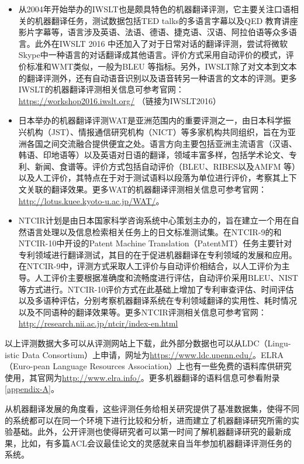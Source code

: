 \begin{itemize}
\vspace{0.5em}
\item 从2004年开始举办的IWSLT也是颇具特色的机器翻译评测，它主要关注口语相关的机器翻译任务，测试数据包括TED talks的多语言字幕以及QED 教育讲座影片字幕等，语言涉及英语、法语、德语、捷克语、汉语、阿拉伯语等众多语言。此外在IWSLT 2016 中还加入了对于日常对话的翻译评测，尝试将微软Skype中一种语言的对话翻译成其他语言。评价方式采用自动评价的模式，评价标准和WMT类似，一般为BLEU 等指标。另外，IWSLT除了对文本到文本的翻译评测外，还有自动语音识别以及语音转另一种语言的文本的评测。更多IWSLT的机器翻译评测相关信息可参考官网：\url{https://workshop2016.iwslt.org/} （链接为IWSLT2016）
\vspace{0.5em}
\item 日本举办的机器翻译评测WAT是亚洲范围内的重要评测之一，由日本科学振兴机构（JST）、情报通信研究机构（NICT）等多家机构共同组织，旨在为亚洲各国之间交流融合提供便宜之处。语言方向主要包括亚洲主流语言（汉语、韩语、印地语等）以及英语对日语的翻译，领域丰富多样，包括学术论文、专利、新闻、食谱等。评价方式包括自动评价（BLEU、RIBES以及AMFM 等）以及人工评价，其特点在于对于测试语料以段落为单位进行评价，考察其上下文关联的翻译效果。更多WAT的机器翻译评测相关信息可参考官网：\url{http://lotus.kuee.kyoto-u.ac.jp/WAT/}。
\vspace{0.5em}
\item NTCIR计划是由日本国家科学咨询系统中心策划主办的，旨在建立一个用在自然语言处理以及信息检索相关任务上的日文标准测试集。在NTCIR-9的和NTCIR-10中开设的Patent Machine Translation（PatentMT）任务主要针对专利领域进行翻译测试，其目的在于促进机器翻译在专利领域的发展和应用。在NTCIR-9中，评测方式采取人工评价与自动评价相结合，以人工评价为主导。人工评价主要根据准确度和流畅度进行评估，自动评价采用BLEU、NIST等方式进行。NTCIR-10评价方式在此基础上增加了专利审查评估、时间评估以及多语种评估，分别考察机器翻译系统在专利领域翻译的实用性、耗时情况以及不同语种的翻译效果等。更多NTCIR评测相关信息可参考官网：\url{http://research.nii.ac.jp/ntcir/index-en.html}
\vspace{0.5em}
\end{itemize}

\parinterval 以上评测数据大多可以从评测网站上下载，此外部分数据也可以从LDC（Lingu-istic Data Consortium）上申请，网址为\url{https://www.ldc.upenn.edu/}。ELRA（Euro-pean Language Resources Association）上也有一些免费的语料库供研究使用，其官网为\url{http://www.elra.info/}。更多机器翻译的语料信息可参看附录\ref{appendix-A}。

\parinterval 从机器翻译发展的角度看，这些评测任务给相关研究提供了基准数据集，使得不同的系统都可以在同一个环境下进行比较和分析，进而建立了机器翻译研究所需的实验基础。此外，公开评测也使得研究者可以第一时间了解机器翻译研究的最新成果，比如，有多篇ACL会议最佳论文的灵感就来自当年参加机器翻译评测任务的系统。

